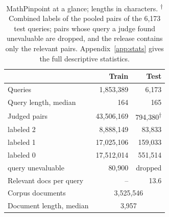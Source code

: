 \begin{table}[t]
\centering
\footnotesize
\setlength{\tabcolsep}{4pt}
\begin{tabular}{lrr}
\toprule
 & Train & Test \\
\midrule
Queries & 1,853,389 & 6,173 \\
Query length, median & 164 & 165 \\
Judged pairs & 43,506,169 & 794,380\textsuperscript{$\dagger$} \\
\quad labeled 2 & 8,888,149 & 83,833 \\
\quad labeled 1 & 17,025,106 & 159,033 \\
\quad labeled 0 & 17,512,014 & 551,514 \\
\quad query unevaluable & 80,900 & dropped \\
Relevant docs per query & -- & 13.6 \\
\midrule
Corpus documents & \multicolumn{2}{c}{3,525,546} \\
Document length, median & \multicolumn{2}{c}{3,957} \\
\bottomrule
\end{tabular}
\caption{MathPinpoint at a glance; lengths in characters. \textsuperscript{$\dagger$}Combined labels of the pooled pairs of the 6,173 test queries; pairs whose query a judge found unevaluable are dropped, and the release contains only the relevant pairs. Appendix~\ref{app:stats} gives the full descriptive statistics.}
\label{tab:stats}
\end{table}
